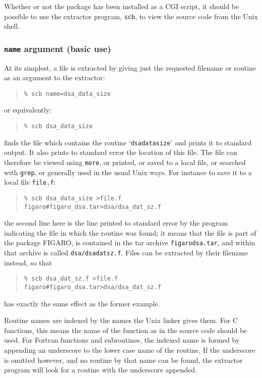 \documentclass[twoside,11pt]{article}
\newcommand{\xlabel}[1]{}
\renewcommand{\_}{\texttt{\symbol{95}}}
\begin{document}
Whether or not the package has been installed as a CGI script,
it should be
possible to use the extractor program, {\tt scb},
to view the source code from the Unix shell.

\subsubsection{\xlabel{sec:extract-name}\label{sec:extract-name}{\tt name} argument (basic use)}

At its simplest, a file is extracted by giving just the
requested filename or routine as an argument to the extractor:
\begin{quote}
\begin{verbatim}
% scb name=dsa_data_size
\end{verbatim}
\end{quote}
or equivalently:
\begin{quote}
\begin{verbatim}
% scb dsa_data_size
\end{verbatim}
\end{quote}
finds the file which contains the routine `{\tt dsa\_data\_size}'
and prints it to standard output.  It also
prints to standard error the location of this file.
The file can therefore be viewed using {\tt more}, or printed,
or saved to a local file, or searched with {\tt grep}, or
generally used in the usual Unix ways.
For instance to save it to a local file {\tt file.f}:
\begin{quote}
\begin{verbatim}
% scb dsa_data_size >file.f
figaro#figaro_dsa.tar>dsa/dsa_dat_sz.f
\end{verbatim}
\end{quote}
the second line here is the line printed to standard error
by the program indicating the file in which the routine was found;
it means that the file is part of the package FIGARO,
is contained in the tar archive {\tt figaro\_dsa.tar}, and
within that archive is called {\tt dsa/dsa\_dat\_sz.f}.
Files can be extracted by their filename instead,
so that
\begin{quote}
\begin{verbatim}
% scb dsa_dat_sz.f >file.f
figaro#figaro_dsa.tar>dsa/dsa_dat_sz.f
\end{verbatim}
\end{quote}
has exactly the same effect as the former example.

Routine names are indexed by the names the Unix linker gives them.
For C functions, this means the name of the function as in the
source code should be used.
For Fortran functions and subroutines, the indexed name is
formed by appending an underscore to the lower case name of the
routine.
If the underscore is omitted however, and no routine by that name
can be found, the extractor program will look for a routine with
the underscore appended.
\end{document}
